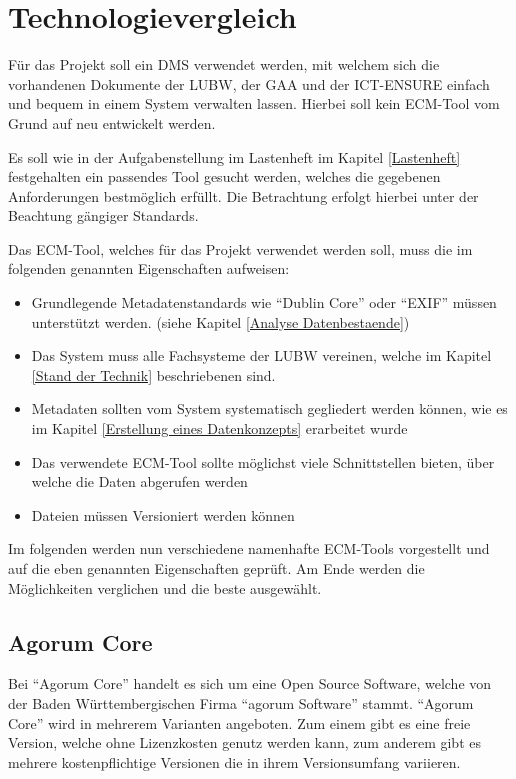 \section{Technologievergleich}
F\"ur das Projekt soll ein \ac{DMS} verwendet werden, mit welchem sich die vorhandenen Dokumente der \ac{LUBW}, der \ac{GAA} und der \ac{ICT-ENSURE} einfach und bequem in einem System verwalten lassen. Hierbei soll kein \ac{ECM}-Tool vom Grund auf neu entwickelt werden. 

Es soll wie in der Aufgabenstellung im Lastenheft im Kapitel \ref{Lastenheft} festgehalten ein passendes Tool gesucht werden, welches die gegebenen Anforderungen bestm\"oglich erf\"ullt. Die Betrachtung erfolgt hierbei unter der Beachtung g\"angiger Standards.

Das \ac{ECM}-Tool, welches f\"ur das Projekt verwendet werden soll, muss die im folgenden genannten Eigenschaften aufweisen:

\begin{itemize}
 \item Grundlegende Metadatenstandards wie "`Dublin Core"' oder "`EXIF"' m\"ussen unterst\"utzt werden. (siehe Kapitel \ref{Analyse Datenbestaende})
 \item Das System muss alle Fachsysteme der \ac{LUBW} vereinen, welche im Kapitel \ref{Stand der Technik} beschriebenen sind.
 \item Metadaten sollten vom System systematisch gegliedert werden k\"onnen, wie es im Kapitel \ref{Erstellung eines Datenkonzepts} erarbeitet wurde
 \item Das verwendete \ac{ECM}-Tool sollte m\"oglichst viele Schnittstellen bieten, \"uber welche die Daten abgerufen werden
 \item Dateien m\"ussen Versioniert werden k\"onnen
\end{itemize}

Im folgenden werden nun verschiedene namenhafte \ac{ECM}-Tools vorgestellt und auf die eben genannten Eigenschaften gepr\"uft. Am Ende werden die M\"oglichkeiten verglichen und die beste ausgew\"ahlt.



\subsection{Agorum Core}
Bei "`Agorum Core"' handelt es sich um eine Open Source Software, welche von der Baden W\"urttembergischen Firma "`agorum Software"' stammt. "`Agorum Core"' wird in mehrerem Varianten angeboten. Zum einem gibt es eine freie Version, welche ohne Lizenzkosten genutz werden kann, zum anderem gibt es mehrere kostenpflichtige Versionen die in ihrem Versionsumfang variieren. \cite{agorum_home} 

